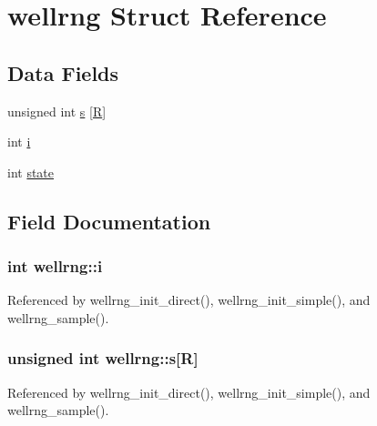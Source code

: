 \hypertarget{structwellrng}{}\section{wellrng Struct Reference}
\label{structwellrng}
\subsection*{Data Fields}
\begin{DoxyCompactItemize}
\item 
unsigned int \hyperlink{structwellrng_aa94cd8a60f6d6357f5acdbf17a32686a}{s} \mbox{[}\hyperlink{wellrng_8c_a5c71a5e59a53413cd6c270266d63b031}{R}\mbox{]}
\item 
int \hyperlink{structwellrng_a6a1c98ed8bba5fb728be9f0b696b37bb}{i}
\item 
int \hyperlink{structwellrng_adac1ae0316c2b966f62efbe228f85a85}{state}
\end{DoxyCompactItemize}


\subsection{Field Documentation}
\subsubsection[{\texorpdfstring{i}{i}}]{\setlength{\rightskip}{0pt plus 5cm}int wellrng\+::i}\hypertarget{structwellrng_a6a1c98ed8bba5fb728be9f0b696b37bb}{}\label{structwellrng_a6a1c98ed8bba5fb728be9f0b696b37bb}


Referenced by wellrng\+\_\+init\+\_\+direct(), wellrng\+\_\+init\+\_\+simple(), and wellrng\+\_\+sample().

\subsubsection[{\texorpdfstring{s}{s}}]{\setlength{\rightskip}{0pt plus 5cm}unsigned int wellrng\+::s\mbox{[}{\bf R}\mbox{]}}\hypertarget{structwellrng_aa94cd8a60f6d6357f5acdbf17a32686a}{}\label{structwellrng_aa94cd8a60f6d6357f5acdbf17a32686a}


Referenced by wellrng\+\_\+init\+\_\+direct(), wellrng\+\_\+init\+\_\+simple(), and wellrng\+\_\+sample().

